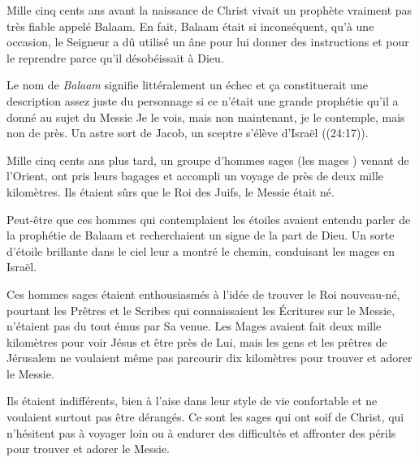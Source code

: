 

Mille cinq cents ans avant la naissance de Christ vivait un prophète vraiment pas très fiable appelé Balaam. En fait, Balaam était si inconséquent, qu'à une occasion, le Seigneur a dû utilisé un âne pour lui donner des instructions et pour le reprendre parce qu'il désobéissait à Dieu.

Le nom de \emph{Balaam} signifie littéralement \Og un échec \Fg{} et ça constituerait une description assez juste du personnage si ce n'était une grande prophétie qu'il a donné au sujet du Messie\frcolon{} \Og Je le vois, mais non maintenant, je le contemple, mais non de près. Un astre sort de Jacob, un sceptre s’élève d’Israël \Fg{} ((24:17)).

Mille cinq cents ans plus tard, un groupe d'hommes sages (\Og les mages \Fg{}) venant de l'Orient, ont pris leurs bagages et accompli un voyage de près de deux mille kilomètres. Ils étaient sûrs que le Roi des Juifs, le Messie était né.

Peut-être que ces hommes qui contemplaient les étoiles avaient entendu parler de la prophétie de Balaam et recherchaient un signe de la part de Dieu. Un sorte d'étoile brillante dans le ciel leur a montré le chemin, conduisant les mages en Israël.

Ces hommes sages étaient enthousiasmés à l'idée de trouver le Roi nouveau-né, pourtant les Prêtres et le Scribes qui connaissaient les Écritures sur le Messie, n'étaient pas du tout émus par Sa venue. Les Mages avaient fait deux mille kilomètres pour voir Jésus et être près de Lui, mais les gens et les prêtres de Jérusalem ne voulaient même pas parcourir dix kilomètres pour trouver et adorer le Messie.

Ils étaient indifférents, bien à l'aise dans leur style de vie confortable et ne voulaient surtout pas être dérangés. Ce sont les sages qui ont soif de Christ, qui n'hésitent pas à voyager loin ou à endurer des difficultés et affronter des périls pour trouver et adorer le Messie.

